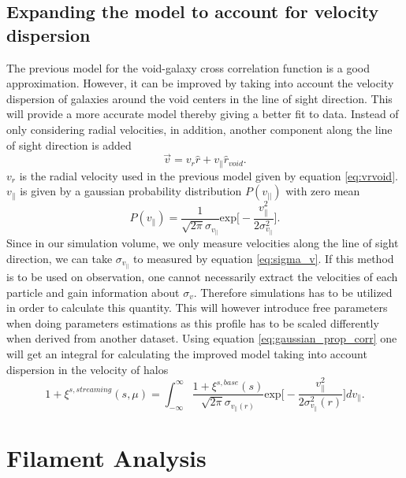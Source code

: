 \subsection{Expanding the model to account for velocity dispersion}
The previous model for the void-galaxy cross correlation function is a good
approximation. However, it can be improved by taking into account the velocity
dispersion of galaxies around the void centers in the line of sight direction.
This will provide a more accurate model thereby giving a better fit to data.
Instead of only considering radial velocities, in addition, another component along the line
of sight direction is added
\begin{equation}
    \vec{v}=v_r\hat{r}+v_\parallel \hat{r}_{void}.
\end{equation}
$v_r$ is the radial velocity used in the previous model given by equation
\ref{eq:vrvoid}. $v_\parallel$ is given by a gaussian probability distribution
$P(v_{\vert\vert})$ with zero mean
\begin{equation}\label{eq:gaussian_prop_corr}
    P(v_\parallel)=\frac{1}{\sqrt{2\pi}\sigma_{v_{\parallel}}}\mathrm{exp}\Big[-\frac{v_\parallel^2}{2\sigma_{v_\parallel}^2}\Big].
\end{equation}
Since in our simulation volume, we only measure velocities along the line of
sight direction, we can take $\sigma_{v_{\parallel}}$ to measured by equation
\ref{eq:sigma_v}. If this method is to be used on observation, one cannot necessarily extract the velocities of each particle and gain information about $\sigma_v$. Therefore simulations has to be utilized in order to calculate this quantity. This will however introduce free parameters when doing parameters estimations as this profile has to be scaled differently when derived from another dataset. Using equation \ref{eq:gaussian_prop_corr} one will get an integral for calculating the improved
model taking into account dispersion in the velocity of halos \cite{BeyondBAO}
\begin{equation}\label{eq:corr_stream}
    1+\xi^{s,streaming}(s,\mu)=\int_{-\infty}^\infty\frac{1+\xi^{s,base}(s)}{\sqrt{2\pi}\sigma_{v_{\parallel}(r)}}\mathrm{exp}\Big[-\frac{v_\parallel^2}{2\sigma_{v_\parallel}^2(r)}\Big]dv_\parallel.
\end{equation}
\section{Filament Analysis}
